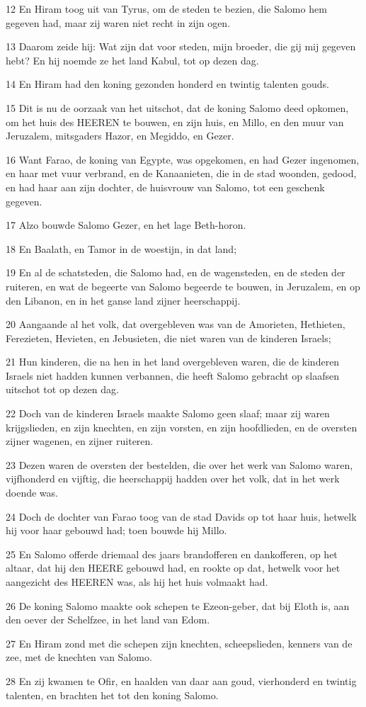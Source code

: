 \par 12 En Hiram toog uit van Tyrus, om de steden te bezien, die Salomo hem gegeven had, maar zij waren niet recht in zijn ogen.
\par 13 Daarom zeide hij: Wat zijn dat voor steden, mijn broeder, die gij mij gegeven hebt? En hij noemde ze het land Kabul, tot op dezen dag.
\par 14 En Hiram had den koning gezonden honderd en twintig talenten gouds.
\par 15 Dit is nu de oorzaak van het uitschot, dat de koning Salomo deed opkomen, om het huis des HEEREN te bouwen, en zijn huis, en Millo, en den muur van Jeruzalem, mitsgaders Hazor, en Megiddo, en Gezer.
\par 16 Want Farao, de koning van Egypte, was opgekomen, en had Gezer ingenomen, en haar met vuur verbrand, en de Kanaanieten, die in de stad woonden, gedood, en had haar aan zijn dochter, de huisvrouw van Salomo, tot een geschenk gegeven.
\par 17 Alzo bouwde Salomo Gezer, en het lage Beth-horon.
\par 18 En Baalath, en Tamor in de woestijn, in dat land;
\par 19 En al de schatsteden, die Salomo had, en de wagensteden, en de steden der ruiteren, en wat de begeerte van Salomo begeerde te bouwen, in Jeruzalem, en op den Libanon, en in het ganse land zijner heerschappij.
\par 20 Aangaande al het volk, dat overgebleven was van de Amorieten, Hethieten, Ferezieten, Hevieten, en Jebusieten, die niet waren van de kinderen Israels;
\par 21 Hun kinderen, die na hen in het land overgebleven waren, die de kinderen Israels niet hadden kunnen verbannen, die heeft Salomo gebracht op slaafsen uitschot tot op dezen dag.
\par 22 Doch van de kinderen Israels maakte Salomo geen slaaf; maar zij waren krijgslieden, en zijn knechten, en zijn vorsten, en zijn hoofdlieden, en de oversten zijner wagenen, en zijner ruiteren.
\par 23 Dezen waren de oversten der bestelden, die over het werk van Salomo waren, vijfhonderd en vijftig, die heerschappij hadden over het volk, dat in het werk doende was.
\par 24 Doch de dochter van Farao toog van de stad Davids op tot haar huis, hetwelk hij voor haar gebouwd had; toen bouwde hij Millo.
\par 25 En Salomo offerde driemaal des jaars brandofferen en dankofferen, op het altaar, dat hij den HEERE gebouwd had, en rookte op dat, hetwelk voor het aangezicht des HEEREN was, als hij het huis volmaakt had.
\par 26 De koning Salomo maakte ook schepen te Ezeon-geber, dat bij Eloth is, aan den oever der Schelfzee, in het land van Edom.
\par 27 En Hiram zond met die schepen zijn knechten, scheepslieden, kenners van de zee, met de knechten van Salomo.
\par 28 En zij kwamen te Ofir, en haalden van daar aan goud, vierhonderd en twintig talenten, en brachten het tot den koning Salomo.

